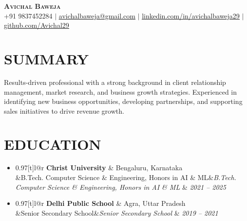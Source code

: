\documentclass[letterpaper,11pt]{article}
\makeatletter
\newcommand{\resumeSubheading}[4]{
  \vspace{-1pt}\item
    \begin{tabular*}{0.97\textwidth}[t]{l@{\extracolsep{\fill}}r}
      \textbf{#1} & #2 \\
      \ifx&#3&\else\textit{\small #3} & \textit{\small #4} \\\fi
    \end{tabular*}\vspace{-5pt}
}
\newcommand{\resumeSubHeadingListStart}{\begin{itemize}[leftmargin=0.15in, label={}]}
\newcommand{\resumeSubHeadingListEnd}{\end{itemize}\vspace{-5pt}}
\makeatother
\begin{document}

\begin{center}
    \textbf{\Huge \scshape Avichal Baweja} \\ \vspace{1pt}
    \small +91 9837452284 $|$ \href{mailto:avichalbaweja@gmail.com}{\underline{avichalbaweja@gmail.com}} $|$ 
    \href{https://www.linkedin.com/in/avichalbaweja29/}{\underline{linkedin.com/in/avichalbaweja29}} $|$
    \href{https://github.com/avichal29}{\underline{github.com/Avichal29}}
\end{center}
\section{SUMMARY}
Results-driven professional with a strong background in client relationship management, market research, and business growth strategies. Experienced in identifying new business opportunities, developing partnerships, and supporting sales initiatives to drive revenue growth.

\section{EDUCATION}
  \resumeSubHeadingListStart
    \resumeSubheading
      {Christ University}{Bengaluru, Karnataka}
      {B.Tech. Computer Science \& Engineering, Honors in AI \& ML}{2021 -- 2025}
    \resumeSubheading
      {Delhi Public School}{Agra, Uttar Pradesh}
      {Senior Secondary School}{2019 -- 2021}
  \resumeSubHeadingListEnd
\end{document}
